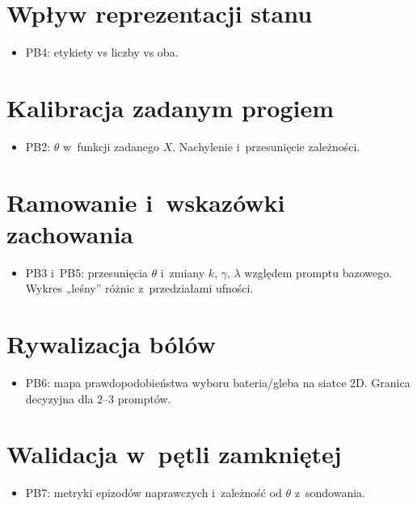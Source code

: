\section{Wpływ reprezentacji stanu}
\label{sec:5-3}

\begin{planroboczy}[ok. 1,5 s.]
\begin{itemize}
  \item PB4: etykiety vs liczby vs oba.
\end{itemize}
\end{planroboczy}

\section{Kalibracja zadanym progiem}
\label{sec:5-4}

\begin{planroboczy}[ok. 2 s.]
\begin{itemize}
  \item PB2: $\theta$ w~funkcji zadanego $X$. Nachylenie i~przesunięcie zależności.
\end{itemize}
\end{planroboczy}

\section{Ramowanie i~wskazówki zachowania}
\label{sec:5-5}

\begin{planroboczy}[ok. 2,5 s.]
\begin{itemize}
  \item PB3 i~PB5: przesunięcia $\theta$ i~zmiany $k$, $\gamma$, $\lambda$ względem promptu bazowego. Wykres „leśny” różnic z~przedziałami ufności.
\end{itemize}
\end{planroboczy}

\section{Rywalizacja bólów}
\label{sec:5-6}

\begin{planroboczy}[ok. 1,5 s.]
\begin{itemize}
  \item PB6: mapa prawdopodobieństwa wyboru bateria/gleba na siatce 2D. Granica decyzyjna dla 2–3 promptów.
\end{itemize}
\end{planroboczy}

\section{Walidacja w~pętli zamkniętej}
\label{sec:5-7}

\begin{planroboczy}[ok. 1,5 s.]
\begin{itemize}
  \item PB7: metryki epizodów naprawczych i~zależność od $\theta$ z~sondowania.
\end{itemize}
\end{planroboczy}
